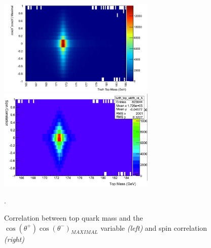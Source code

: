 \begin{figure}[hbtp]
	\begin{center}
	\includegraphics[width = 75mm]{f/TopCorrelationMass}
	\includegraphics[width = 75mm]{f/Spinvstopwidth}
	\end{center}
        \caption{Correlation between top quark mass and the $\cos(\theta^+)\cos(\theta^-)_{MAXIMAL}$ variable \emph{(left)} and spin correlation \emph{(right)}}.	
        \label{fig:top_width}
\end{figure}